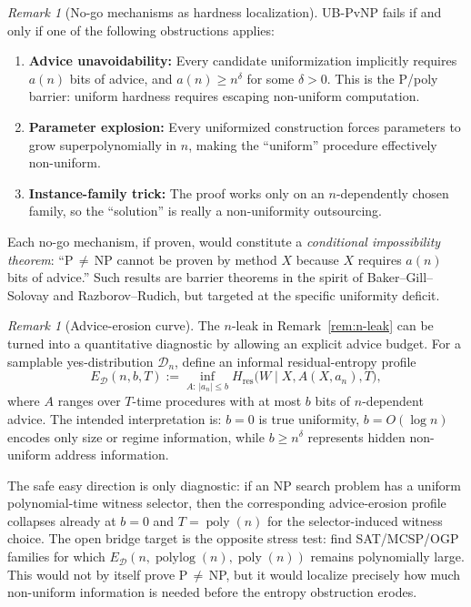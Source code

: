 \documentclass[aps,prd,twocolumn,superscriptaddress,nofootinbib]{revtex4-2}
\theoremstyle{definition}
\theoremstyle{remark}
\newtheorem{remark}[theorem]{Remark}
\DeclareMathOperator{\poly}{poly}
\begin{document}
\begin{remark}[No-go mechanisms as hardness localization]\label{rem:ub-nogo}
UB-PvNP fails if and only if one of the following obstructions applies:
\begin{enumerate}
\item \textbf{Advice unavoidability:} Every candidate uniformization implicitly requires $a(n)$ bits of advice, and $a(n) \geq n^\delta$ for some $\delta > 0$. This is the P/poly barrier: uniform hardness requires escaping non-uniform computation.
\item \textbf{Parameter explosion:} Every uniformized construction forces parameters to grow superpolynomially in $n$, making the ``uniform'' procedure effectively non-uniform.
\item \textbf{Instance-family trick:} The proof works only on an $n$-dependently chosen family, so the ``solution'' is really a non-uniformity outsourcing.
\end{enumerate}
Each no-go mechanism, if proven, would constitute a \emph{conditional impossibility theorem}: ``P$\,\neq\,$NP cannot be proven by method $X$ because $X$ requires $a(n)$ bits of advice.'' Such results are barrier theorems in the spirit of Baker--Gill--Solovay and Razborov--Rudich, but targeted at the specific uniformity deficit.
\end{remark}

\begin{remark}[Advice-erosion curve]\label{rem:advice-erosion}
The $n$-leak in Remark~\ref{rem:n-leak} can be turned into a quantitative
diagnostic by allowing an explicit advice budget.  For a samplable
yes-distribution $\mathcal{D}_n$, define an informal residual-entropy profile
\[
E_{\mathcal{D}}(n,b,T)
  := \inf_{A:\,|a_n|\leq b}
     H_{\mathrm{res}}\bigl(W \mid X,A(X,a_n),T\bigr),
\]
where $A$ ranges over $T$-time procedures with at most $b$ bits of
$n$-dependent advice.  The intended interpretation is:
$b=0$ is true uniformity, $b=O(\log n)$ encodes only size or regime
information, while $b\geq n^\delta$ represents hidden non-uniform address
information.

The safe easy direction is only diagnostic: if an NP search problem has a
uniform polynomial-time witness selector, then the corresponding
advice-erosion profile collapses already at $b=0$ and $T=\poly(n)$ for the
selector-induced witness choice.  The open bridge target is the opposite
stress test: find SAT/MCSP/OGP families for which
$E_{\mathcal{D}}(n,\operatorname{polylog}(n),\poly(n))$ remains polynomially large.  This
would not by itself prove P$\,\neq\,$NP, but it would localize precisely how
much non-uniform information is needed before the entropy obstruction erodes.
\end{remark}
\end{document}
